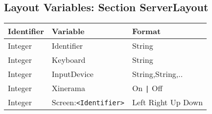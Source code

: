 \subsection{Layout Variables: Section ServerLayout}
\begin{tabular}[h]{|p{2cm}|p{4cm}|p{7cm}|}
 \hline
 \textbf{Identifier} & \textbf{Variable}     & \textbf{Format}        \\
 \hline
 Integer & Identifier                 & String                   \\
 Integer & Keyboard                   & String                   \\
 Integer & InputDevice                & String,String,..         \\
 Integer & Xinerama                   & On \verb+|+ Off          \\
 Integer & Screen:\verb+<Identifier>+ & Left Right Up Down  \\
 \hline
\end{tabular}

\newpage

